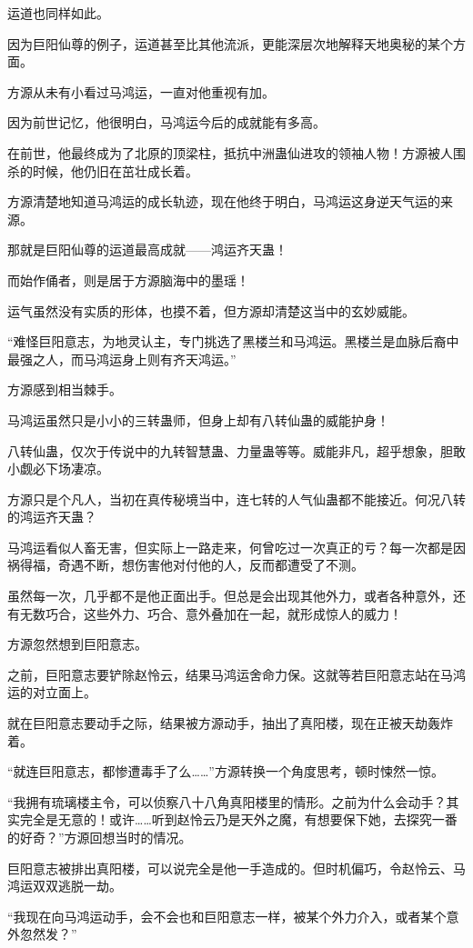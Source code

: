\begin{this_body}
运道也同样如此。

因为巨阳仙尊的例子，运道甚至比其他流派，更能深层次地解释天地奥秘的某个方面。

方源从未有小看过马鸿运，一直对他重视有加。

因为前世记忆，他很明白，马鸿运今后的成就能有多高。

在前世，他最终成为了北原的顶梁柱，抵抗中洲蛊仙进攻的领袖人物！方源被人围杀的时候，他仍旧在茁壮成长着。

方源清楚地知道马鸿运的成长轨迹，现在他终于明白，马鸿运这身逆天气运的来源。

那就是巨阳仙尊的运道最高成就——鸿运齐天蛊！

而始作俑者，则是居于方源脑海中的墨瑶！

运气虽然没有实质的形体，也摸不着，但方源却清楚这当中的玄妙威能。

“难怪巨阳意志，为地灵认主，专门挑选了黑楼兰和马鸿运。黑楼兰是血脉后裔中最强之人，而马鸿运身上则有齐天鸿运。”

方源感到相当棘手。

马鸿运虽然只是小小的三转蛊师，但身上却有八转仙蛊的威能护身！

八转仙蛊，仅次于传说中的九转智慧蛊、力量蛊等等。威能非凡，超乎想象，胆敢小觑必下场凄凉。

方源只是个凡人，当初在真传秘境当中，连七转的人气仙蛊都不能接近。何况八转的鸿运齐天蛊？

马鸿运看似人畜无害，但实际上一路走来，何曾吃过一次真正的亏？每一次都是因祸得福，奇遇不断，想伤害他对付他的人，反而都遭受了不测。

虽然每一次，几乎都不是他正面出手。但总是会出现其他外力，或者各种意外，还有无数巧合，这些外力、巧合、意外叠加在一起，就形成惊人的威力！

方源忽然想到巨阳意志。

之前，巨阳意志要铲除赵怜云，结果马鸿运舍命力保。这就等若巨阳意志站在马鸿运的对立面上。

就在巨阳意志要动手之际，结果被方源动手，抽出了真阳楼，现在正被天劫轰炸着。

“就连巨阳意志，都惨遭毒手了么……”方源转换一个角度思考，顿时悚然一惊。

“我拥有琉璃楼主令，可以侦察八十八角真阳楼里的情形。之前为什么会动手？其实完全是无意的！或许……听到赵怜云乃是天外之魔，有想要保下她，去探究一番的好奇？”方源回想当时的情况。

巨阳意志被排出真阳楼，可以说完全是他一手造成的。但时机偏巧，令赵怜云、马鸿运双双逃脱一劫。

“我现在向马鸿运动手，会不会也和巨阳意志一样，被某个外力介入，或者某个意外忽然发？”


\end{this_body}
